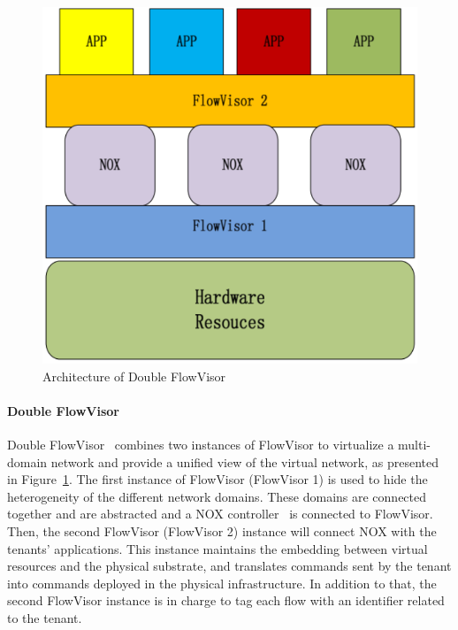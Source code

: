 \begin{figure}[ht]
    \centering
    \includegraphics[scale=0.6]{figures/double_fv.pdf}
    \caption{Architecture of Double FlowVisor}
    \label{fig:double-fv}
\end{figure}

\paragraph{Double FlowVisor}
Double FlowVisor~\cite{DoubleFV-Yin2013} combines two instances of FlowVisor to virtualize a multi-domain network and provide a unified view of the virtual network, as presented in Figure~\ref{fig:double-fv}. The first instance of FlowVisor (FlowVisor 1) is used to hide the heterogeneity of the different network domains. These domains are connected together and are abstracted and a NOX controller~\cite{nox-gude2008} is connected to FlowVisor.
Then, the second FlowVisor  (FlowVisor 2) instance will connect NOX with the tenants' applications. This instance maintains the embedding between virtual resources and the physical substrate, and translates commands sent by the tenant into commands deployed in the physical infrastructure. In addition to that, the second FlowVisor instance is in charge to tag each flow with an identifier related to the tenant.

